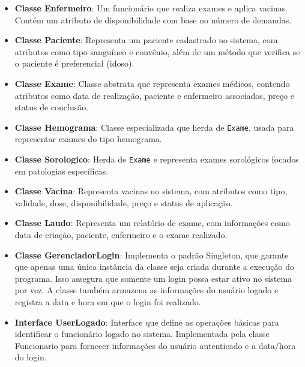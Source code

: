 \documentclass{article}
\begin{document}
\begin{itemize}
        \item \textbf{Classe Enfermeiro}: 
        Um funcionário que realiza exames e aplica vacinas. Contém um atributo de disponibilidade com base no número de demandas.

        \item \textbf{Classe Paciente}: 
        Representa um paciente cadastrado no sistema, com atributos como tipo sanguíneo e convênio, além de um método que verifica se o paciente é preferencial (idoso).
    
        \item \textbf{Classe Exame}: 
        Classe abstrata que representa exames médicos, contendo atributos como data de realização, paciente e enfermeiro associados, preço e status de conclusão.

        \item \textbf{Classe Hemograma}: 
        Classe especializada que herda de \texttt{Exame}, usada para representar exames do tipo hemograma.

        \newpage 
        
        \item \textbf{Classe Sorologico}: 
        Herda de \texttt{Exame} e representa exames sorológicos focados em patologias específicas.

        \item \textbf{Classe Vacina}: 
        Representa vacinas no sistema, com atributos como tipo, validade, dose, disponibilidade, preço e status de aplicação.

        \item \textbf{Classe Laudo}: 
        Representa um relatório de exame, com informações como data de criação, paciente, enfermeiro e o exame realizado.
    
        \item \textbf{Classe GerenciadorLogin}: 
        Implementa o padrão Singleton, que garante que apenas uma única instância da classe seja criada durante a execução do programa. Isso assegura que somente um login possa estar ativo no sistema por vez. A classe também armazena as informações do usuário logado e registra a data e hora em que o login foi realizado.

        \item \textbf{Interface UserLogado}:
        Interface que define as operações básicas para identificar o funcionário logado no sistema. Implementada pela classe Funcionario para fornecer informações do usuário autenticado e a data/hora do login.
    
    \end{itemize}
\end{document}
